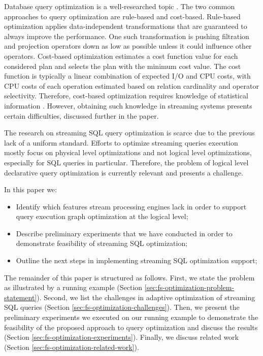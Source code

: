 Database query optimization is a well-researched topic \cite{astrahan1976system, haas1989extensible, graefe1993volcano}. 
The two common approaches to query optimization are rule-based and cost-based. Rule-based optimization applies data-independent transformations that are guaranteed to always improve the performance. One such transformation is pushing filtration and projection operators down as low as possible unless it could influence other operators. Cost-based optimization estimates a cost function value for each considered plan and selects the plan with the minimum cost value. The cost function is typically a linear combination of expected I/O and CPU costs, with CPU costs of each operation estimated based on relation cardinality and operator selectivity. Therefore, cost-based optimization requires knowledge of statistical information \cite{Neumann2018optimization}. However, obtaining such knowledge in streaming systems presents certain difficulties, discussed further in the paper.


The research on streaming SQL query optimization is scarce due to the previous lack of a uniform standard. Efforts to optimize streaming queries execution mostly focus on physical level optimizations \cite{grulich2020grizzly, gedik2009code} and not logical level optimizations, especially for SQL queries in particular. Therefore, the problem of logical level declarative query optimization is currently relevant and presents a challenge.


In this paper we:
\begin{itemize}
    \item Identify which features stream processing engines lack in order to support query execution graph optimization at the logical level;
    \item Describe preliminary experiments that we have conducted in order to demonstrate feasibility of streaming SQL optimization;
    \item Outline the next steps in implementing streaming SQL optimization support; %
\end{itemize}

The remainder of this paper is structured as follows. First, we state the problem as illustrated by a running example (Section \ref{sec:fs-optimization-problem-statement}). Second, we list the challenges in adaptive optimization of streaming SQL queries (Section \ref{sec:fs-optimization-challenges}). Then, we present the preliminary experiments we executed on our running example to demonstrate the feasibility of the proposed approach to query optimization and discuss the results (Section \ref{sec:fs-optimization-experiments}). Finally, we discuss related work (Section \ref{sec:fs-optimization-related-work}).     




